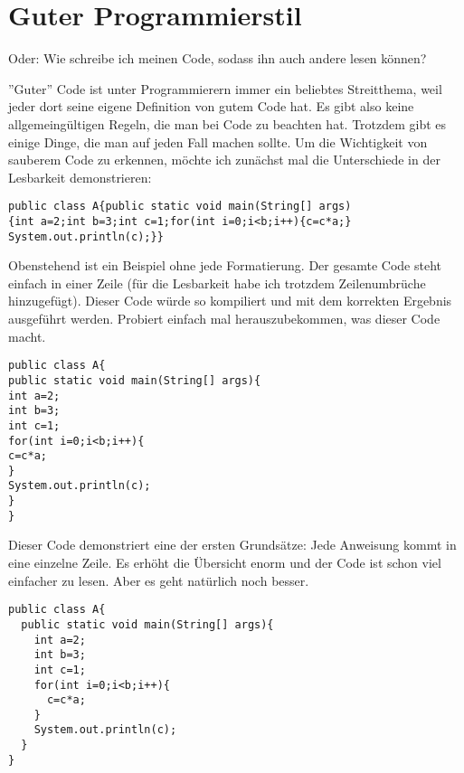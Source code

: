 \chapter{Guter Programmierstil}

Oder: Wie schreibe ich meinen Code, sodass ihn auch andere lesen können?

''Guter'' Code ist unter Programmierern immer ein beliebtes Streitthema, weil jeder dort seine eigene Definition von gutem Code hat. Es gibt also keine allgemeingültigen Regeln, die man bei Code zu beachten hat. Trotzdem gibt es einige Dinge, die man auf jeden Fall machen sollte. Um die Wichtigkeit von sauberem Code zu erkennen, möchte ich zunächst mal die Unterschiede in der Lesbarkeit demonstrieren:

\begin{minipage}{\textwidth}
\begin{lstlisting}
public class A{public static void main(String[] args)
{int a=2;int b=3;int c=1;for(int i=0;i<b;i++){c=c*a;}
System.out.println(c);}}
\end{lstlisting}
\end{minipage}

Obenstehend ist ein Beispiel ohne jede Formatierung. Der gesamte Code steht einfach in einer Zeile (für die Lesbarkeit habe ich trotzdem Zeilenumbrüche hinzugefügt). Dieser Code würde so kompiliert und mit dem korrekten Ergebnis ausgeführt werden. Probiert einfach mal herauszubekommen, was dieser Code macht.

\begin{minipage}{\textwidth}
\begin{lstlisting}
public class A{
public static void main(String[] args){
int a=2;
int b=3;
int c=1;
for(int i=0;i<b;i++){
c=c*a;
}
System.out.println(c);
}
}
\end{lstlisting}
\end{minipage}

Dieser Code demonstriert eine der ersten Grundsätze: Jede Anweisung kommt in eine einzelne Zeile. Es erhöht die Übersicht enorm und der Code ist schon viel einfacher zu lesen. Aber es geht natürlich noch besser.

\begin{minipage}{\textwidth}
\begin{lstlisting}
public class A{
  public static void main(String[] args){
    int a=2;
    int b=3;
    int c=1;
    for(int i=0;i<b;i++){
      c=c*a;
    }
    System.out.println(c);
  }
}
\end{lstlisting}
\end{minipage}

